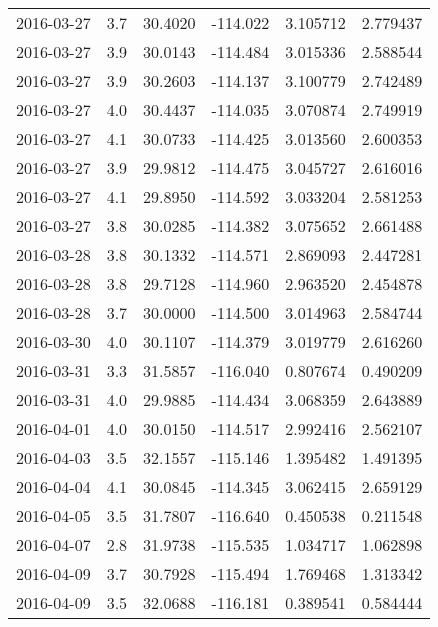 \begin{tabular}{lrrrrr}
2016-03-27 &       3.7 &  30.4020 &  -114.022 &         3.105712 &         2.779437 \\
2016-03-27 &       3.9 &  30.0143 &  -114.484 &         3.015336 &         2.588544 \\
2016-03-27 &       3.9 &  30.2603 &  -114.137 &         3.100779 &         2.742489 \\
2016-03-27 &       4.0 &  30.4437 &  -114.035 &         3.070874 &         2.749919 \\
2016-03-27 &       4.1 &  30.0733 &  -114.425 &         3.013560 &         2.600353 \\
2016-03-27 &       3.9 &  29.9812 &  -114.475 &         3.045727 &         2.616016 \\
2016-03-27 &       4.1 &  29.8950 &  -114.592 &         3.033204 &         2.581253 \\
2016-03-27 &       3.8 &  30.0285 &  -114.382 &         3.075652 &         2.661488 \\
2016-03-28 &       3.8 &  30.1332 &  -114.571 &         2.869093 &         2.447281 \\
2016-03-28 &       3.8 &  29.7128 &  -114.960 &         2.963520 &         2.454878 \\
2016-03-28 &       3.7 &  30.0000 &  -114.500 &         3.014963 &         2.584744 \\
2016-03-30 &       4.0 &  30.1107 &  -114.379 &         3.019779 &         2.616260 \\
2016-03-31 &       3.3 &  31.5857 &  -116.040 &         0.807674 &         0.490209 \\
2016-03-31 &       4.0 &  29.9885 &  -114.434 &         3.068359 &         2.643889 \\
2016-04-01 &       4.0 &  30.0150 &  -114.517 &         2.992416 &         2.562107 \\
2016-04-03 &       3.5 &  32.1557 &  -115.146 &         1.395482 &         1.491395 \\
2016-04-04 &       4.1 &  30.0845 &  -114.345 &         3.062415 &         2.659129 \\
2016-04-05 &       3.5 &  31.7807 &  -116.640 &         0.450538 &         0.211548 \\
2016-04-07 &       2.8 &  31.9738 &  -115.535 &         1.034717 &         1.062898 \\
2016-04-09 &       3.7 &  30.7928 &  -115.494 &         1.769468 &         1.313342 \\
2016-04-09 &       3.5 &  32.0688 &  -116.181 &         0.389541 &         0.584444 \\

\end{tabular}
